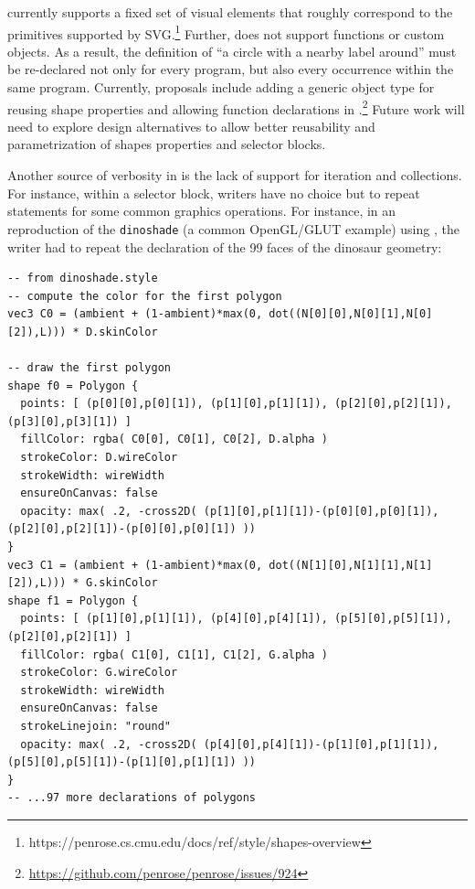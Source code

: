 \noindent \Penrose{} currently supports a fixed set of visual elements that roughly correspond to the primitives supported by SVG.\footnote{https://penrose.cs.cmu.edu/docs/ref/style/shapes-overview} Further, \Style{} does not support functions or custom objects. As a result, the definition of ``a circle with a nearby label around'' must be re-declared not only for every \Style{} program, but also every occurrence within the same \Style{} program. Currently, proposals include adding a generic object type for reusing shape properties and allowing function declarations in \Style{}.\footnote{\url{https://github.com/penrose/penrose/issues/924}} Future work will need to explore design alternatives to allow better reusability and parametrization of shapes properties and \Style{} selector blocks.

Another source of verbosity in \Style{} is the lack of support for iteration and collections. For instance, within a selector block, \Style{} writers have no choice but to repeat statements for some common graphics operations. For instance, in an reproduction of the \texttt{dinoshade} (a common OpenGL/GLUT example) using \Penrose{}, the \Style{} writer had to repeat the declaration of the 99 faces of the dinosaur geometry:

\begin{mdframed}[style=STYCode]
\begin{lstlisting}[language=Sty-RT,escapechar=@]
-- from dinoshade.style
-- compute the color for the first polygon
vec3 C0 = (ambient + (1-ambient)*max(0, dot((N[0][0],N[0][1],N[0][2]),L))) * D.skinColor

-- draw the first polygon
shape f0 = Polygon {
  points: [ (p[0][0],p[0][1]), (p[1][0],p[1][1]), (p[2][0],p[2][1]), (p[3][0],p[3][1]) ]
  fillColor: rgba( C0[0], C0[1], C0[2], D.alpha )
  strokeColor: D.wireColor
  strokeWidth: wireWidth
  ensureOnCanvas: false
  opacity: max( .2, -cross2D( (p[1][0],p[1][1])-(p[0][0],p[0][1]), (p[2][0],p[2][1])-(p[0][0],p[0][1]) ))
}
vec3 C1 = (ambient + (1-ambient)*max(0, dot((N[1][0],N[1][1],N[1][2]),L))) * G.skinColor
shape f1 = Polygon {
  points: [ (p[1][0],p[1][1]), (p[4][0],p[4][1]), (p[5][0],p[5][1]), (p[2][0],p[2][1]) ]
  fillColor: rgba( C1[0], C1[1], C1[2], G.alpha )
  strokeColor: G.wireColor
  strokeWidth: wireWidth
  ensureOnCanvas: false
  strokeLinejoin: "round"
  opacity: max( .2, -cross2D( (p[4][0],p[4][1])-(p[1][0],p[1][1]), (p[5][0],p[5][1])-(p[1][0],p[1][1]) ))
}
-- ...97 more declarations of polygons
\end{lstlisting}
\end{mdframed}

